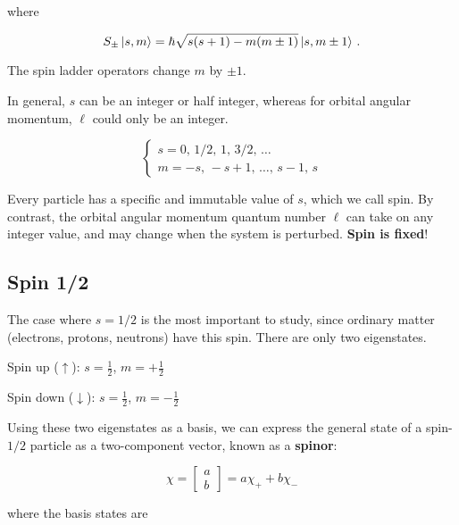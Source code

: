 \documentclass[12pt, titlepage]{article}
\begin{document}
where

\begin{equation}
	S_{\pm}\ket{s, m} = \hbar\sqrt{s(s+1)-m(m\pm1)}\ket{s, m\pm1} \, .
\end{equation}

The spin ladder operators change $m$ by $\pm 1$.


In general, $s$ can be an integer or half integer, whereas for orbital angular momentum, $\ell$ could only be an integer.

\begin{equation}
	\left\{
	\begin{array}{l}
	s = 0, \, 1/2, \, 1, \, 3/2, \, \ldots \\
	m = -s, \, -s+1, \, \ldots, \, s-1, \, s
	\end{array}
	\right.
\end{equation}

Every particle has a specific and immutable value of $s$, which we call spin. By contrast, the orbital angular momentum quantum number $\ell$ can take on any integer value, and may change when the system is perturbed. \textbf{Spin is fixed}!

\subsection{Spin 1/2}
The case where $s=1/2$ is the most important to study, since ordinary matter (electrons, protons, neutrons) have this spin. There are only two eigenstates.

\begin{description}
	\item Spin up ($\uparrow$): $s=\frac{1}{2}$, $m=+\frac{1}{2}$
	\item Spin down ($\downarrow$): $s=\frac{1}{2}$, $m=-\frac{1}{2}$
\end{description}

Using these two eigenstates as a basis, we can express the general state of a spin-$1/2$ particle as a two-component vector, known as a \textbf{spinor}:

\begin{equation}
	\chi = \begin{bmatrix} a \\ b \end{bmatrix} = a\chi_+ + b\chi_- 
\end{equation}

where the basis states are
\end{document}
